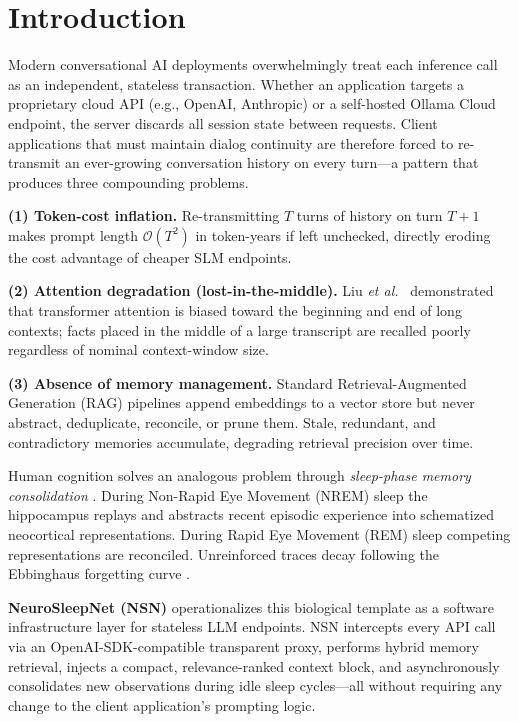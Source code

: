 \documentclass[conference]{IEEEtran}
\begin{document}
\section{Introduction}\label{sec:intro}

Modern conversational AI deployments overwhelmingly treat each inference
call as an independent, stateless transaction.  Whether an application targets
a proprietary cloud API (e.g., OpenAI, Anthropic) or a self-hosted Ollama
Cloud endpoint, the server discards all session state between requests.
Client applications that must maintain dialog continuity are therefore forced
to re-transmit an ever-growing conversation history on every turn---a
pattern that produces three compounding problems.

\textbf{(1) Token-cost inflation.}  Re-transmitting $T$ turns of history on
turn $T\!+\!1$ makes prompt length $\mathcal{O}(T^2)$ in token-years if left
unchecked, directly eroding the cost advantage of cheaper SLM endpoints.

\textbf{(2) Attention degradation (lost-in-the-middle).}  Liu \emph{et al.}\
\cite{liu2024lost} demonstrated that transformer attention is biased toward
the beginning and end of long contexts; facts placed in the middle of a large
transcript are recalled poorly regardless of nominal context-window size.

\textbf{(3) Absence of memory management.}  Standard Retrieval-Augmented
Generation (RAG) \cite{lewis2020rag} pipelines append embeddings to a vector
store but never abstract, deduplicate, reconcile, or prune them.  Stale,
redundant, and contradictory memories accumulate, degrading retrieval
precision over time.

Human cognition solves an analogous problem through \emph{sleep-phase memory
consolidation} \cite{diekelmann2010memory}.  During Non-Rapid Eye Movement
(NREM) sleep the hippocampus replays and abstracts recent episodic experience
into schematized neocortical representations.  During Rapid Eye Movement (REM)
sleep competing representations are reconciled.  Unreinforced traces decay
following the Ebbinghaus forgetting curve \cite{ebbinghaus1885}.

\textbf{NeuroSleepNet (NSN)} operationalizes this biological template as a
software infrastructure layer for stateless LLM endpoints.  NSN intercepts
every API call via an OpenAI-SDK-compatible transparent proxy, performs
hybrid memory retrieval, injects a compact, relevance-ranked context block,
and asynchronously consolidates new observations during idle sleep cycles---all
without requiring any change to the client application's prompting logic.
\end{document}
